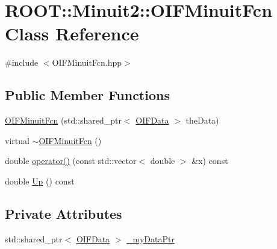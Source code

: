 \hypertarget{classROOT_1_1Minuit2_1_1OIFMinuitFcn}{
\section{ROOT::Minuit2::OIFMinuitFcn Class Reference}
\label{d3/dc7/classROOT_1_1Minuit2_1_1OIFMinuitFcn}
}


{\ttfamily \#include $<$OIFMinuitFcn.hpp$>$}

\subsection*{Public Member Functions}
\begin{DoxyCompactItemize}
\item 
\hyperlink{classROOT_1_1Minuit2_1_1OIFMinuitFcn_aff2f5645420e8719ebc6415b04184433}{OIFMinuitFcn} (std::shared\_\-ptr$<$ \hyperlink{classOIFData}{OIFData} $>$ theData)
\item 
virtual \hyperlink{classROOT_1_1Minuit2_1_1OIFMinuitFcn_a6f933e4568fc0d8ad5a6d3d6ad2fd727}{$\sim$OIFMinuitFcn} ()
\item 
double \hyperlink{classROOT_1_1Minuit2_1_1OIFMinuitFcn_a63e67f9e6ea5bf0dcfd09102d3d37eb1}{operator()} (const std::vector$<$ double $>$ \&x) const 
\item 
double \hyperlink{classROOT_1_1Minuit2_1_1OIFMinuitFcn_a6f55d1c39778acd5bbed8e04e6f049e4}{Up} () const 
\end{DoxyCompactItemize}
\subsection*{Private Attributes}
\begin{DoxyCompactItemize}
\item 
std::shared\_\-ptr$<$ \hyperlink{classOIFData}{OIFData} $>$ \hyperlink{classROOT_1_1Minuit2_1_1OIFMinuitFcn_a0fd03437f3d07ab064773733efb8e4bf}{\_\-myDataPtr}
\end{DoxyCompactItemize}


